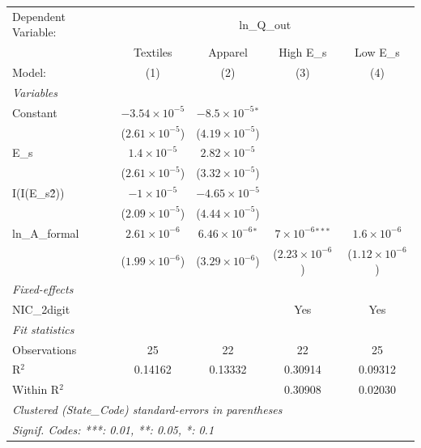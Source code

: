 
\begingroup
\centering
\begin{tabular}{lcccc}
   \tabularnewline \midrule \midrule
   Dependent Variable: & \multicolumn{4}{c}{ln\_Q\_out}\\
                   & Textiles                & Apparel                     & High E\_s                  & Low E\_s \\    
   Model:          & (1)                     & (2)                         & (3)                        & (4)\\  
   \midrule
   \emph{Variables}\\
   Constant        & $-3.54\times 10^{-5}$   & $-8.5\times 10^{-5}$$^{*}$  &                            &   \\   
                   & ($2.61\times 10^{-5}$)  & ($4.19\times 10^{-5}$)      &                            &   \\   
   E\_s            & $1.4\times 10^{-5}$     & $2.82\times 10^{-5}$        &                            &   \\   
                   & ($2.61\times 10^{-5}$)  & ($3.32\times 10^{-5}$)      &                            &   \\   
   I(I(E\_s\^2))   & $-1\times 10^{-5}$      & $-4.65\times 10^{-5}$       &                            &   \\   
                   & ($2.09\times 10^{-5}$)  & ($4.44\times 10^{-5}$)      &                            &   \\   
   ln\_A\_formal   & $2.61\times 10^{-6}$    & $6.46\times 10^{-6}$$^{*}$  & $7\times 10^{-6}$$^{***}$  & $1.6\times 10^{-6}$\\    
                   & ($1.99\times 10^{-6}$)  & ($3.29\times 10^{-6}$)      & ($2.23\times 10^{-6}$)     & ($1.12\times 10^{-6}$)\\    
   \midrule
   \emph{Fixed-effects}\\
   NIC\_2digit     &                         &                             & Yes                        & Yes\\  
   \midrule
   \emph{Fit statistics}\\
   Observations    & 25                      & 22                          & 22                         & 25\\  
   R$^2$           & 0.14162                 & 0.13332                     & 0.30914                    & 0.09312\\  
   Within R$^2$    &                         &                             & 0.30908                    & 0.02030\\  
   \midrule \midrule
   \multicolumn{5}{l}{\emph{Clustered (State\_Code) standard-errors in parentheses}}\\
   \multicolumn{5}{l}{\emph{Signif. Codes: ***: 0.01, **: 0.05, *: 0.1}}\\
\end{tabular}
\par\endgroup


